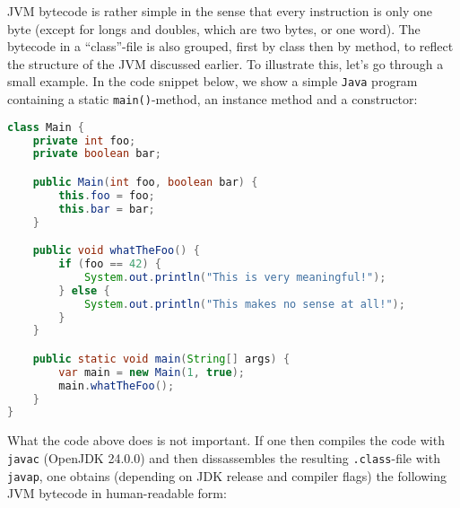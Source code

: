 JVM bytecode is rather simple in the sense that every instruction is only one byte (except for longs and doubles, which are two bytes, or one word).
The bytecode in a ``class''-file is also grouped, first by class then by method, to reflect the structure of the JVM discussed earlier.
To illustrate this, let's go through a small example. In the code snippet below, we show a simple \texttt{Java} program containing a static
\texttt{main()}-method, an instance method and a constructor:

\begin{lstlisting}[language=Java]
class Main {
    private int foo;
    private boolean bar;

    public Main(int foo, boolean bar) {
        this.foo = foo;
        this.bar = bar;
    }

    public void whatTheFoo() {
        if (foo == 42) {
            System.out.println("This is very meaningful!");
        } else {
            System.out.println("This makes no sense at all!");
        }
    }

    public static void main(String[] args) {
        var main = new Main(1, true);
        main.whatTheFoo();
    }
}
\end{lstlisting}

What the code above does is not important. If one then compiles the code with \texttt{javac} (OpenJDK 24.0.0) and then
dissassembles the resulting \texttt{.class}-file with \texttt{javap}, one obtains (depending on JDK release and compiler flags)
the following JVM bytecode in human-readable form:

